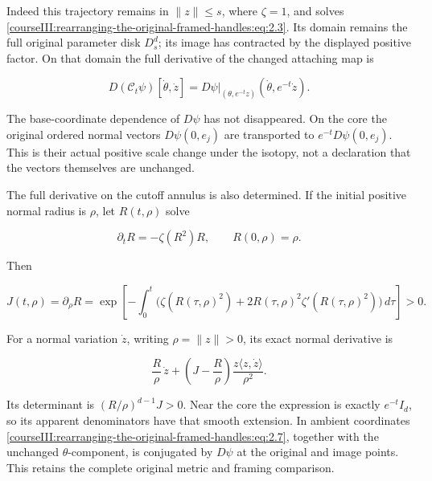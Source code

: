 Indeed this trajectory remains in \(\|z\|\leq s\), where \(\zeta=1\), and solves \eqref{courseIII:rearranging-the-original-framed-handles:eq:2.3}. Its domain remains the full original parameter disk \(D_s^d\); its image has contracted by the displayed positive factor. On that domain the full derivative of the changed attaching map is

\begin{equation}
D(\mathcal C_t\psi)[\dot\theta,\dot z]
=D\psi|_{(\theta,e^{-t}z)}(\dot\theta,e^{-t}\dot z).
\label{courseIII:rearranging-the-original-framed-handles:eq:2.5}
\end{equation}

The base-coordinate dependence of \(D\psi\) has not disappeared. On the core the original ordered normal vectors \(D\psi(0,e_j)\) are transported to \(e^{-t}D\psi(0,e_j)\). This is their actual positive scale change under the isotopy, not a declaration that the vectors themselves are unchanged.

The full derivative on the cutoff annulus is also determined. If the initial positive normal radius is \(\rho\), let \(R(t,\rho)\) solve

\[
\partial_t R=-\zeta(R^2)R,\qquad R(0,\rho)=\rho.
\]

Then

\begin{equation}
J(t,\rho)=\partial_\rho R
=\exp\left[-\int_0^t
 \bigl(\zeta(R(\tau,\rho)^2)
      +2R(\tau,\rho)^2\zeta'(R(\tau,\rho)^2)\bigr)\,d\tau\right]>0.
\label{courseIII:rearranging-the-original-framed-handles:eq:2.6}
\end{equation}

For a normal variation \(\dot z\), writing \(\rho=\|z\|>0\), its exact normal derivative is

\begin{equation}
\frac R\rho\,\dot z+
\left(J-\frac R\rho\right)
 \frac{z\langle z,\dot z\rangle}{\rho^2}.
\label{courseIII:rearranging-the-original-framed-handles:eq:2.7}
\end{equation}

Its determinant is \((R/\rho)^{d-1}J>0\). Near the core the expression is exactly \(e^{-t}I_d\), so its apparent denominators have that smooth extension. In ambient coordinates \eqref{courseIII:rearranging-the-original-framed-handles:eq:2.7}, together with the unchanged \(\theta\)-component, is conjugated by \(D\psi\) at the original and image points. This retains the complete original metric and framing comparison.

